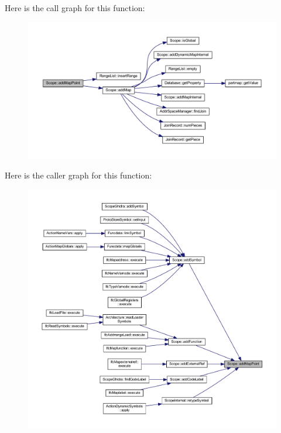 Here is the call graph for this function\+:
\nopagebreak
\begin{figure}[H]
\begin{center}
\leavevmode
\includegraphics[width=350pt]{class_scope_a03a0309ce54c25e56871edbfdfe25675_cgraph}
\end{center}
\end{figure}
Here is the caller graph for this function\+:
\nopagebreak
\begin{figure}[H]
\begin{center}
\leavevmode
\includegraphics[width=350pt]{class_scope_a03a0309ce54c25e56871edbfdfe25675_icgraph}
\end{center}
\end{figure}
\mbox{\label{class_scope_a421f1b66be24bd5a20c77761e7a51268}} 
